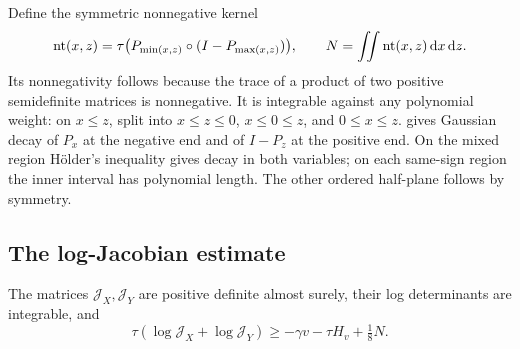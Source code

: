 Define the symmetric nonnegative kernel
\[
 \operatorname{nt}(x,z)
 =\tau\bigl(P_{\min(x,z)}\circ(I-P_{\max(x,z)})\bigr),
 \qquad
 N=\iint\operatorname{nt}(x,z)\,\mathrm{d} x\,\mathrm{d} z.
\]
Its nonnegativity follows because the trace of a product of two positive semidefinite matrices is nonnegative. It is integrable against any polynomial weight: on $x\le z$, split into $x\le z\le0$, $x\le0\le z$, and $0\le x\le z$.  gives Gaussian decay of $P_x$ at the negative end and of $I-P_z$ at the positive end. On the mixed region H\"older's inequality gives decay in both variables; on each same-sign region the inner interval has polynomial length. The other ordered half-plane follows by symmetry.

\subsection{The log-Jacobian estimate}
\begin{lemma}\label{lem:log-jacobian}
The matrices $\mathcal{J}_X,\mathcal{J}_Y$ are positive definite almost surely, their log determinants are integrable, and
\begin{equation}
\tau(\log\mathcal{J}_X+\log\mathcal{J}_Y)
\ge-\gamma v-\tau H_v+\tfrac18N.
\label{eq:jacobian-lower-bound}
\end{equation}
\end{lemma}
